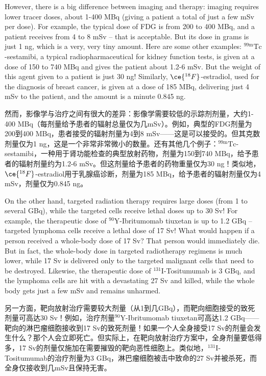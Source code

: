 \documentclass[dvipsnames, svgnames,a4paper,11pt]{article}
\begin{document}
However, there is a big difference between imaging and therapy: imaging requires lower tracer doses, about 1-400 MBq (giving a patient a total of just a few mSv per dose). For example, the typical dose of FDG is from 200 to 400 MBq, and a patient receives from 4 to 8 mSv – that is acceptable. But its dose in grams is just 1 ng, which is a very, very tiny amount. Here are some other examples: \(\mathrm{{}^{99m}Tc}\)-sestamibi, a typical radiopharmaceutical for kidney function tests, is given at a dose of 150 to 740 MBq and gives the patient about 1.2-6 mSv. But the weight of this agent given to a patient is just 30 ng! Similarly, \(\ce{^{18}F}\)-estradiol, used for the diagnosis of breast cancer, is given at a dose of 185 MBq, delivering just 4 mSv to the patient, and the amount is a minute 0.845 ng.

然而，影像学与治疗之间有很大的差异：影像学需要较低的示踪剂剂量，大约1-400 MBq（每剂量给予患者的辐射总量仅为几mSv）。例如，典型的FDG剂量为200到400 MBq，患者接受的辐射剂量为4到8 mSv——这是可以接受的。但其克数剂量仅为1 ng，这是一个非常非常微小的数量。还有其他几个例子：\(\mathrm{{}^{99m}Tc}\)-sestamibi，一种用于肾功能检查的典型放射药物，剂量为150到740 MBq，给予患者的辐射剂量约为1.2-6 mSv。但这剂量给予患者的药物重量仅为30 ng！类似地，\(\ce{^{18}F}\)-estradiol用于乳腺癌诊断，剂量为185 MBq，给予患者的辐射剂量仅为4 mSv，剂量仅为0.845 ng。

On the other hand, targeted radiation therapy requires large doses (from 1 to several GBq), while the targeted cells receive lethal doses up to 30 Sv! For example, the therapeutic dose of \(\mathrm{{}^{90}Y}\)-Ibritumomab tiuxetan is up to 1.2 GBq – targeted lymphoma cells receive a lethal dose of 17 Sv! What would happen if a person received a whole-body dose of 17 Sv? That person would immediately die. But in fact, the whole-body dose in targeted radiotherapy regimens is much lower, while 17 Sv is delivered only to the targeted malignant cells that need to be destroyed. Likewise, the therapeutic dose of \(\mathrm{{}^{131}I}\)-Tositumumab is 3 GBq, and the lymphoma cells are hit with a devastating 27 Sv and killed, while the whole body gets just a few mSv and remains unharmed.


另一方面，靶向放射治疗需要较大剂量（从1到几GBq），而靶向细胞接受的致死剂量可高达30 Sv！例如，治疗剂量\(\mathrm{{}^{90}Y}\)-Ibritumomab tiuxetan可高达1.2 GBq——靶向的淋巴瘤细胞接收到17 Sv的致死剂量！如果一个人全身接受17 Sv的剂量会发生什么？那个人会立即死亡。但实际上，在靶向放射治疗方案中，全身剂量要低得多，17 Sv的剂量仅施加在需要摧毁的靶向恶性细胞上。类似地，\(\mathrm{{}^{131}I}\)-Tositumumab的治疗剂量为3 GBq，淋巴瘤细胞被击中致命的27 Sv并被杀死，而全身仅接收到几mSv且保持无害。
\end{document}
